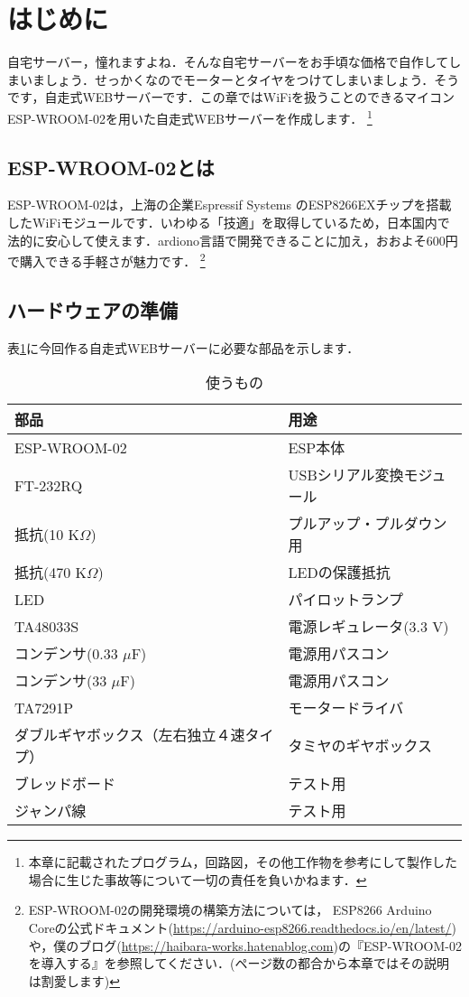 \section{はじめに}
自宅サーバー，憧れますよね．そんな自宅サーバーをお手頃な価格で自作してしまいましょう．せっかくなのでモーターとタイヤをつけてしまいましょう．そうです，自走式WEBサーバーです．この章ではWiFiを扱うことのできるマイコン ESP-WROOM-02を用いた自走式WEBサーバーを作成します．
\footnote{本章に記載されたプログラム，回路図，その他工作物を参考にして製作した場合に生じた事故等について一切の責任を負いかねます．}
\subsection{ESP-WROOM-02とは}
ESP-WROOM-02は，上海の企業Espressif Systems のESP8266EXチップを搭載したWiFiモジュールです．いわゆる「技適」を取得しているため，日本国内で法的に安心して使えます．ardiono言語で開発できることに加え，おおよそ600円で購入できる手軽さが魅力です．
\footnote{ESP-WROOM-02の開発環境の構築方法については， ESP8266 Arduino Coreの公式ドキュメント(\url{https://arduino-esp8266.readthedocs.io/en/latest/})や，僕のブログ(\url{https://haibara-works.hatenablog.com})の『ESP-WROOM-02を導入する』を参照してください．(ページ数の都合から本章ではその説明は割愛します)}

\subsection{ハードウェアの準備}
表\ref{buhin}に今回作る自走式WEBサーバーに必要な部品を示します．
\begin{table}[htb]
\centering
\caption{使うもの}
\begin{tabular}{|l|l|} \hline
部品 & 用途 \\ \hline \hline
ESP-WROOM-02 & ESP本体  \\ \hline
FT-232RQ & USBシリアル変換モジュール  \\ \hline
抵抗(10 K$\Omega$) & プルアップ・プルダウン用  \\ \hline
抵抗(470 K$\Omega$) & LEDの保護抵抗 \\ \hline
LED & パイロットランプ  \\ \hline
TA48033S & 電源レギュレータ(3.3 V) \\ \hline
コンデンサ(0.33 $\mu$F) & 電源用パスコン  \\ \hline
コンデンサ(33 $\mu$F) & 電源用パスコン  \\ \hline
TA7291P & モータードライバ \\ \hline
ダブルギヤボックス（左右独立４速タイプ） & タミヤのギヤボックス  \\ \hline
ブレッドボード & テスト用 \\ \hline
ジャンパ線 & テスト用 \\ \hline
\end{tabular}
\label{buhin}
\end{table}

